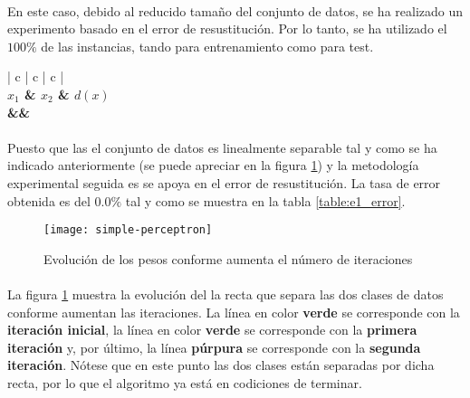 \documentclass{article}
\begin{document}
		\paragraph{}
		En este caso, debido al reducido tamaño del conjunto de datos, se ha realizado un experimento basado en el error de resustitución. Por lo tanto, se ha utilizado el $100\%$ de las instancias, tando para entrenamiento como para test.

		\begin{table}[H]
			\centering
			\begin{tabu}{ | c | c | c |}
				\hline
				 \\ \hline
				\bfseries $x_1$ & \bfseries $x_2$ & \bfseries $d(x)$
				{\\\hline\one&\two&\three}
				\\\hline
			\end{tabu}
			\caption{Conjunto de datos Simple}
			\label{table:e1_dataset}
		\end{table}

		\paragraph{}
		Puesto que las el conjunto de datos es linealmente separable tal y como se ha indicado anteriormente (se puede apreciar en la figura \ref{fig:e1_plot}) y la metodología experimental seguida es se apoya en el error de resustitución. La tasa de error obtenida es del $0.0\%$ tal y como se muestra en la tabla \ref{table:e1_error}.

		\begin{figure}[h]
			\begin{center}
				\texttt{[image: simple-perceptron]}
			\end{center}
			\caption{Evolución de los pesos conforme aumenta el número de iteraciones}
			\label{fig:e1_plot}
		\end{figure}

		\paragraph{}
		La figura \ref{fig:e1_plot} muestra la evolución del la recta que separa las dos clases de datos conforme aumentan las iteraciones. La línea en color \textbf{verde} se corresponde con la \textbf{iteración inicial}, la línea en color \textbf{verde} se corresponde con la \textbf{primera iteración} y, por último, la línea \textbf{púrpura} se corresponde con la \textbf{segunda iteración}. Nótese que en este punto las dos clases están separadas por dicha recta, por lo que el algoritmo ya está en codiciones de terminar.
\end{document}
